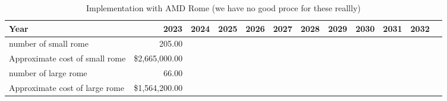 \tiny \begin{longtable} { |p{}  |r  |r  |r  |r  |r  |r  |r  |r  |r  |r  |r |} 
\caption{Implementation with AMD Rome (we have no good proce for these reallly) \label{tab:opsRome}}\\ 
\hline 
\textbf{Year}&\textbf{2023}&\textbf{2024}&\textbf{2025}&\textbf{2026}&\textbf{2027}&\textbf{2028}&\textbf{2029}&\textbf{2030}&\textbf{2031}&\textbf{2032} \\ \hline
{number of small rome }&{205.00}&&&&&&&&& \\ \hline
{Approximate cost of small rome }&{\$2,665,000.00}&&&&&&&&& \\ \hline
{number of large rome }&{66.00}&&&&&&&&& \\ \hline
{Approximate cost of large rome }&{\$1,564,200.00}&&&&&&&&& \\ \hline
\end{longtable} \normalsize
